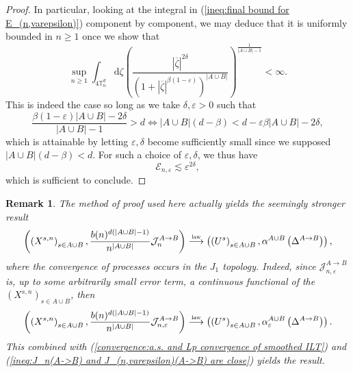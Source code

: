 \documentclass[10pt,a4paper]{amsart}
\newcommand{\J}{\mathcal J}
\newcommand{\TT}{\mathbb T}
\newcommand{\1}{\mathds{1}}
\renewcommand{\d}{\mathrm d}
\newcommand{\distribution}{\stackrel{\scaleto{\mathrm{law}}{4pt}}{\longrightarrow}}
\newtheorem*{remark}{Remark}
\numberwithin{equation}{section}
\begin{document}
\begin{proof}
    In particular, looking at the integral in (\ref{ineq:final bound for E_(n,varepsilon)}) component by component, we may deduce that it is uniformly bounded in $n\ge1$ once we show that 
    \begin{equation}
        \label{ineq:uniform in n bound on E_(n,varepsilon)}
        \sup_{n\ge1}\int_{4\TT_n^{d}}\d\zeta\left(\frac{|\overline\zeta|^{2\delta}}{\left(1+|\overline\zeta|^{\beta(1-\varepsilon)}\right)^{|A\cup B|}}\right)^{\frac{1}{|A\cup B|-1}}<\infty.
    \end{equation}
    This is indeed the case so long as we take $\delta,\varepsilon>0$ such that 
    \begin{equation*}
        \frac{\beta(1-\varepsilon)|A\cup B|-2\delta}{|A\cup B|-1}>d\iff |A\cup B|(d-\beta)<d-\varepsilon\beta|A\cup B|-2\delta,
    \end{equation*}
    which is attainable by letting $\varepsilon,\delta$ become sufficiently small since we supposed $|A\cup B|(d-\beta)<d$. For such a choice of $\varepsilon,\delta$, we thus have
    \begin{equation*}
        \mathcal E_{n,\varepsilon}\lesssim\varepsilon^{2\delta},
    \end{equation*}
    which is sufficient to conclude.
\end{proof}
\begin{remark}
        The method of proof used here actually yields the seemingly stronger result
    \begin{equation*}
        \left(\left(X^{s,n}\right)_{s\in A\cup B},\frac{b(n)^{d(|A\cup B|-1)}}{n^{|A\cup B|}}\mathcal J_n^{A\rightarrow B}\right)\distribution\left(\left(U^s\right)_{s\in A\cup B},\alpha^{A\cup B}\left(\Delta^{A\rightarrow B}\right)\right),
    \end{equation*}
    where the convergence of processes occurs in the $J_1$ topology. Indeed, since $\J_{n,\varepsilon}^{A\rightarrow B}$ is, up to some arbitrarily small error term, a continuous functional of the $\left(X^{s,n}\right)_{s\in A\cup B}$, then 
    \begin{equation*}
        \left(\left(X^{s,n}\right)_{s\in A\cup B},\frac{b(n)^{d(|A\cup B|-1)}}{n^{|A\cup B|}}\mathcal J_{n,\varepsilon}^{A\rightarrow B}\right)\distribution\left(\left(U^s\right)_{s\in A\cup B},\alpha_\varepsilon^{A\cup B}\left(\Delta^{A\rightarrow B}\right)\right).
    \end{equation*}
    This combined with (\ref{convergence:a.s. and Lp convergence of smoothed ILT}) and (\ref{ineq:J_n(A->B) and J_(n,varepsilon)(A->B) are close}) yields the result.
    \end{remark}
\end{document}
